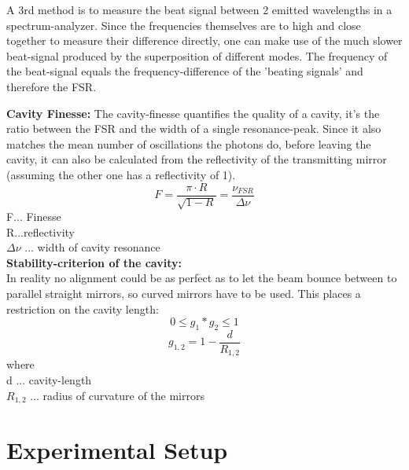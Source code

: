 \documentclass[12pt,a4paper]{article}
\begin{document}
\begin{multicols}{2}
\noindent A 3rd method is to measure the beat signal between 2 emitted wavelengths in a spectrum-analyzer. Since the frequencies themselves are to high and close together to measure their difference directly, one can make use of the much slower beat-signal produced by the superposition of different modes. The frequency of the beat-signal equals the frequency-difference of the 'beating signals' and therefore the FSR.

\noindent \textbf{Cavity Finesse:}
The cavity-finesse quantifies the quality of a cavity, it's the ratio between the FSR and the width of a single resonance-peak. Since it also matches the mean number of oscillations the photons do, before leaving the cavity, it can also be calculated from the reflectivity of the transmitting mirror (assuming the other one has a reflectivity of 1).
$$F = \frac{\pi \cdot R}{\sqrt{1 - R}} = \frac{\nu_{FSR}}{\Delta \nu}$$
F... Finesse\\
R...reflectivity\\
$\Delta \nu$ ... width of cavity resonance\\

\noindent \textbf{Stability-criterion of the cavity:}\\
In reality no alignment could be as perfect as to let the beam bounce between to parallel straight mirrors, so curved mirrors have to be used. This places a restriction on the cavity length:
$$0 \le g_1*g_2 \le 1$$
$$g_{1,2} = 1 - \frac{d}{R_{1,2}}$$
where\\
d ... cavity-length\\
$R_{1,2}$ ... radius of curvature of the mirrors\\

\section{Experimental Setup}

\end{multicols}
\end{document}
